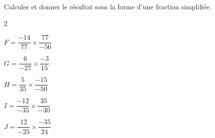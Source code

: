 \begin{exercice*}
    Calculer et donner le résultat sous la forme d'une fraction simplifiée.
    \begin{multicols}2
        \begin{list}{}{}
            \begin{spacing}{2}
                \item $F = \dfrac{-14}{77}\times\dfrac{77}{-56}$
                \item $G = \dfrac{6}{-27}\times\dfrac{-3}{15}$
                \item $H = \dfrac{5}{35}\times\dfrac{-15}{-50}$
                \item $I = \dfrac{-12}{-35}\times\dfrac{35}{-30}$
                \item $J = \dfrac{12}{-25}\times\dfrac{-35}{24}$
            \end{spacing}
        \end{list}
    \end{multicols}


\end{exercice*}
